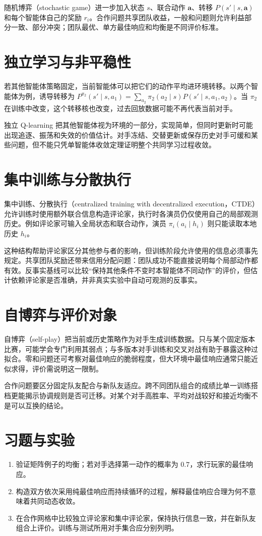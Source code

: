 \documentclass[UTF8,12pt,a4paper,fontset=fandol]{ctexbook}
\begin{document}
随机博弈（stochastic game）进一步加入状态 $s$、联合动作 $\boldsymbol a$、转移 $P(s'\mid s,\boldsymbol a)$ 和每个智能体自己的奖励 $r_i$。合作问题共享团队收益，一般和问题则允许利益部分一致、部分冲突；团队最优、单方最佳响应和均衡是不同评价标准。

\section{独立学习与非平稳性}

若其他智能体策略固定，当前智能体可以把它们的动作平均进环境转移。以两个智能体为例，诱导转移为 $P^{\pi_2}(s'\mid s,a_1)=\sum_{a_2}\pi_2(a_2\mid s)P(s'\mid s,a_1,a_2)$。当 $\pi_2$ 在训练中改变，这个转移核也改变，过去回放数据可能不再代表当前对手。

独立 Q-learning 把其他智能体视为环境的一部分，实现简单，但同时更新时可能出现追逐、振荡和失效的价值估计。对手冻结、交替更新或保存历史对手可缓和某些问题，但不能只凭单智能体收敛定理证明整个共同学习过程收敛。

\section{集中训练与分散执行}

集中训练、分散执行（centralized training with decentralized execution，CTDE）允许训练时使用额外联合信息构造评论家，执行时各演员仍仅使用自己的局部观测历史。例如评论家可输入全局状态和联合动作，演员 $\pi_i(a_i\mid h_i)$ 则只能读取本地历史 $h_i$。

这种结构帮助评论家区分其他参与者的影响，但训练阶段允许使用的信息必须事先规定。共享团队奖励还带来信用分配问题：团队成功不能直接说明每个局部动作都有效。反事实基线可以比较“保持其他条件不变时本智能体不同动作”的评价，但估计依赖评论家是否准确，并非真实实验中自动可观测的反事实。

\section{自博弈与评价对象}

自博弈（self-play）把当前或历史策略作为对手生成训练数据。只与某个固定版本比赛，可能学会专门利用其弱点；与多版本对手训练和交叉对战有助于暴露这种过拟合。零和问题还可考察对最佳响应的脆弱程度，但大环境中最佳响应通常只能近似求得，评价需说明这一限制。

合作问题要区分固定队友配合与新队友适应。跨不同团队组合的成绩比单一训练搭档更能揭示协调规则是否可迁移。对某个对手高胜率、平均对战较好和接近均衡不是可以互换的结论。

\section{习题与实验}
\begin{enumerate}
\item 验证矩阵例子的均衡；若对手选择第一动作的概率为 $0.7$，求行玩家的最佳响应。
\item 构造双方依次采用纯最佳响应而持续循环的过程，解释最佳响应合理为何不意味着共同动态收敛。
\item 在合作网格中比较独立评论家和集中评论家，保持执行信息一致，并在新队友组合上评价。训练与测试所用对手集合应分别列明。
\end{enumerate}
\end{document}
